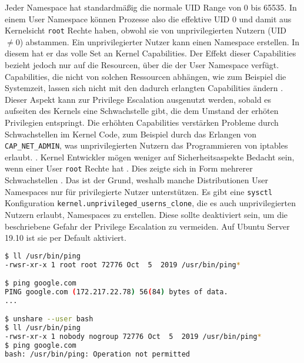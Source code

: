 Jeder Namespace hat standardmäßig die normale UID Range von 0 bis 65535. In einem User Namespace können Prozesse also die effektive UID 0 und damit aus Kernelsicht \texttt{root} Rechte haben, obwohl sie von unprivilegierten Nutzern (UID $\neq 0$) abstammen. Ein unprivilegierter Nutzer kann einen Namespace erstellen. In diesem hat er das volle Set an Kernel Capabilities. Der Effekt dieser Capabilities bezieht jedoch nur auf die Resourcen, über die der User Namespace verfügt. Capabilities, die
nicht von solchen Ressourcen abhängen, wie zum Beispiel die Systemzeit, lassen sich nicht mit den dadurch erlangten Capabilities ändern \cite{man-user-ns}.
Dieser Aspekt kann zur Privilege Escalation ausgenutzt werden, sobald es aufseiten des Kernels eine Schwachstelle gibt, die dem Umstand der erhöten Privilegien entspringt. Die erhöhten Capabilities verstärken Probleme durch Schwachstellen im Kernel Code, zum Beispiel durch das Erlangen von \texttt{CAP\_NET\_ADMIN}, was unprivilegierten Nutzern das Programmieren von iptables erlaubt. \cite{lwn-controlling-access}. Kernel Entwickler mögen weniger auf Sicherheitsaspekte Bedacht sein, wenn einer
User \texttt{root} Rechte hat \cite{kerrisk-anatomy}. Dies zeigte
sich in Form mehrerer Schwachstellen \cite{cve-2013-1858, cve-2014-5206, cve-2014-5207, cve-2016-3135, cve-2017-1000111}. Das ist der Grund, weshalb manche Distributionen User Namespaces nur für privilegierte Nutzer unterstützen. Es gibt eine \texttt{sysctl} Konfiguration \texttt{kernel.unprivileged\_userns\_clone}, die es auch unprivilegierten Nutzern erlaubt, Namespaces zu erstellen. Diese sollte deaktiviert sein, um die beschriebene Gefahr der Privilege Escalation
zu vermeiden. Auf Ubuntu Server 19.10 ist sie per Default aktiviert.

\begin{lstlisting}[language=sh,caption={Eliminieren von root-Setuid Vulnerabilities mithilfe von User Namespaces}]
$ ll /usr/bin/ping
-rwsr-xr-x 1 root root 72776 Oct  5  2019 /usr/bin/ping*

$ ping google.com
PING google.com (172.217.22.78) 56(84) bytes of data.
...

$ unshare --user bash
$ ll /usr/bin/ping
-rwsr-xr-x 1 nobody nogroup 72776 Oct  5  2019 /usr/bin/ping*
$ ping google.com
bash: /usr/bin/ping: Operation not permitted
\end{lstlisting}

